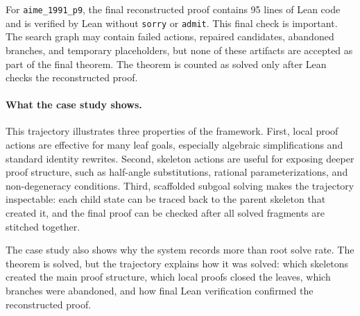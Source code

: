 For \texttt{aime\_1991\_p9}, the final reconstructed proof contains 95 lines of Lean code and is verified by Lean without \texttt{sorry} or \texttt{admit}. This final check is important. The search graph may contain failed actions, repaired candidates, abandoned branches, and temporary placeholders, but none of these artifacts are accepted as part of the final theorem. The theorem is counted as solved only after Lean checks the reconstructed proof.

\paragraph{What the case study shows.}
This trajectory illustrates three properties of the framework. First, local proof actions are effective for many leaf goals, especially algebraic simplifications and standard identity rewrites. Second, skeleton actions are useful for exposing deeper proof structure, such as half-angle substitutions, rational parameterizations, and non-degeneracy conditions. Third, scaffolded subgoal solving makes the trajectory inspectable: each child state can be traced back to the parent skeleton that created it, and the final proof can be checked after all solved fragments are stitched together.

The case study also shows why the system records more than root solve rate. The theorem is solved, but the trajectory explains how it was solved: which skeletons created the main proof structure, which local proofs closed the leaves, which branches were abandoned, and how final Lean verification confirmed the reconstructed proof.
